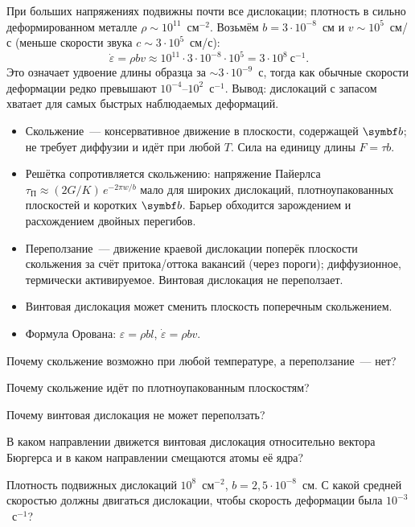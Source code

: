 \begin{primer}
При больших напряжениях подвижны почти все дислокации; плотность в
сильно деформированном металле $\rho\sim10^{11}$~см$^{-2}$. Возьмём
$b=3\cdot10^{-8}$~см и $v\sim10^5$~см/с (меньше скорости звука
$c\sim3\cdot10^5$~см/с):
\[
\dot\varepsilon=\rho bv\approx10^{11}\cdot3\cdot10^{-8}\cdot10^{5}=3\cdot10^{8}~\text{с}^{-1}.
\]
Это означает удвоение длины образца за $\sim3\cdot10^{-9}$~с, тогда как
обычные скорости деформации редко превышают $10^{-4}$--$10^{2}$~с$^{-1}$.
Вывод: дислокаций с запасом хватает для самых быстрых наблюдаемых
деформаций.
\end{primer}

\begin{itogi}
\begin{itemize}
\item Скольжение~— консервативное движение в плоскости, содержащей $\vb b$;
не требует диффузии и идёт при любой $T$. Сила на единицу длины $F=\tau b$.
\item Решётка сопротивляется скольжению: напряжение Пайерлса
$\tau_\text{П}\approx(2G/K)\,e^{-2\pi w/b}$ мало для широких дислокаций,
плотноупакованных плоскостей и коротких $\vb b$. Барьер обходится
зарождением и расхождением двойных перегибов.
\item Переползание~— движение краевой дислокации поперёк плоскости
скольжения за счёт притока/оттока вакансий (через пороги); диффузионное,
термически активируемое. Винтовая дислокация не переползает.
\item Винтовая дислокация может сменить плоскость поперечным скольжением.
\item Формула Орована: $\varepsilon=\rho bl$, $\dot\varepsilon=\rho bv$.
\end{itemize}
\end{itogi}

\begin{proverka}
\item Почему скольжение возможно при любой температуре, а переползание~—
нет?
\item Почему скольжение идёт по плотноупакованным плоскостям?
\item Почему винтовая дислокация не может переползать?
\item В каком направлении движется винтовая дислокация относительно
вектора Бюргерса и в каком направлении смещаются атомы её ядра?
\item Плотность подвижных дислокаций $10^{8}$~см$^{-2}$, $b=2{,}5\cdot10^{-8}$~см.
С какой средней скоростью должны двигаться дислокации, чтобы скорость
деформации была $10^{-3}$~с$^{-1}$?
\end{proverka}
